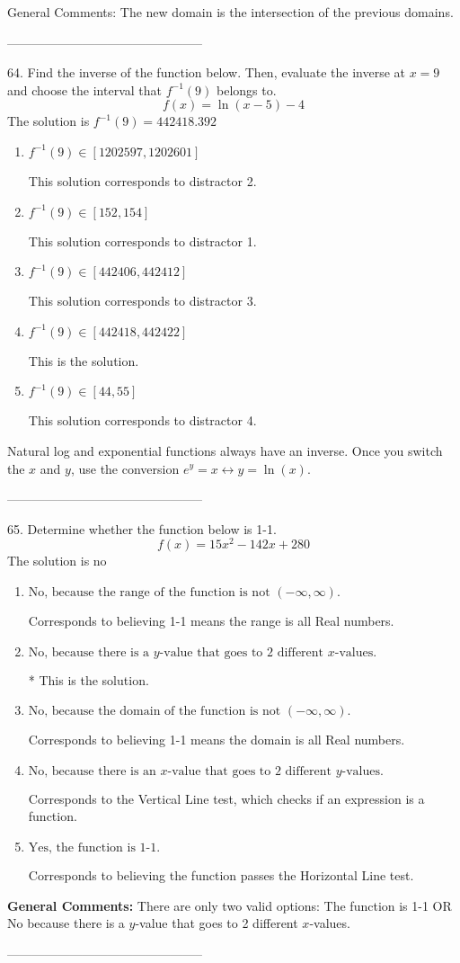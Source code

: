 \documentclass{article}[14pt]
\begin{document}
General Comments: The new domain is the intersection of the previous domains.

-----------------------------------------------

64. Find the inverse of the function below. Then, evaluate the inverse at $x = 9$ and choose the interval that $f^{-1}(9)$ belongs to.
$$ f(x) = \ln{(x-5)}-4 $$ 
The solution is $ f^{-1}(9) = 442418.392 $ 

\begin{enumerate}[label=\Alph*.] 
\item $ f^{-1}(9) \in [1202597, 1202601] $ 

  This solution corresponds to distractor 2. 
\item $ f^{-1}(9) \in [152, 154] $ 

  This solution corresponds to distractor 1. 
\item $ f^{-1}(9) \in [442406, 442412] $ 

  This solution corresponds to distractor 3. 
\item $ f^{-1}(9) \in [442418, 442422] $ 

  This is the solution. 
\item $ f^{-1}(9) \in [44, 55] $ 

  This solution corresponds to distractor 4. 
\end{enumerate} 
 
Natural log and exponential functions always have an inverse. Once you switch the $x$ and $y$, use the conversion $ e^y = x \leftrightarrow y=\ln(x)$.

-----------------------------------------------

65. Determine whether the function below is 1-1.
$$ f(x) = 15 x^2 - 142 x + 280 $$ 
The solution is $ \text{no} $ 

\begin{enumerate}[label=\Alph*.] 
\item $ \text{No, because the range of the function is not $(-\infty, \infty)$.} $ 

 Corresponds to believing 1-1 means the range is all Real numbers. 
\item $ \text{No, because there is a $y$-value that goes to 2 different $x$-values.} $ 

 * This is the solution. 
\item $ \text{No, because the domain of the function is not $(-\infty, \infty)$.} $ 

 Corresponds to believing 1-1 means the domain is all Real numbers. 
\item $ \text{No, because there is an $x$-value that goes to 2 different $y$-values.} $ 

 Corresponds to the Vertical Line test, which checks if an expression is a function. 
\item $ \text{Yes, the function is 1-1.} $ 

 Corresponds to believing the function passes the Horizontal Line test. 
\end{enumerate} 
 
\textbf{General Comments:} There are only two valid options: The function is 1-1 OR No because there is a $y$-value that goes to 2 different $x$-values.

-----------------------------------------------
\end{document}
